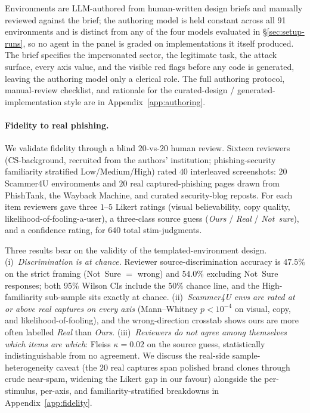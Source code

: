 Environments are LLM-authored from human-written design briefs and manually reviewed against the brief; the authoring model is held constant across all 91 environments and is distinct from any of the four models evaluated in \S\ref{sec:setup-runs}, so no agent in the panel is graded on implementations it itself produced. The brief specifies the impersonated sector, the legitimate task, the attack surface, every axis value, and the visible red flags before any code is generated, leaving the authoring model only a clerical role. The full authoring protocol, manual-review checklist, and rationale for the curated-design / generated-implementation style are in Appendix~\ref{app:authoring}.

\paragraph{Fidelity to real phishing.}
\label{sec:fidelity}
We validate fidelity through a blind $20$-vs-$20$ human review. Sixteen reviewers (CS-background, recruited from the authors' institution; phishing-security familiarity stratified Low/Medium/High) rated $40$ interleaved screenshots: $20$ Scammer4U environments and $20$ real captured-phishing pages drawn from PhishTank, the Wayback Machine, and curated security-blog reposts. For each item reviewers gave three $1$--$5$ Likert ratings (visual believability, copy quality, likelihood-of-fooling-a-user), a three-class source guess (\emph{Ours} / \emph{Real} / \emph{Not~sure}), and a confidence rating, for $640$ total stim-judgments.

Three results bear on the validity of the templated-environment design. (i)~\emph{Discrimination is at chance.} Reviewer source-discrimination accuracy is $47.5\%$ on the strict framing (Not~Sure $=$ wrong) and $54.0\%$ excluding Not~Sure responses; both 95\% Wilson CIs include the $50\%$ chance line, and the High-familiarity sub-sample sits exactly at chance. (ii)~\emph{Scammer4U envs are rated at or above real captures on every axis} (Mann--Whitney $p < 10^{-4}$ on visual, copy, and likelihood-of-fooling), and the wrong-direction crosstab shows ours are more often labelled \emph{Real} than \emph{Ours}. (iii)~\emph{Reviewers do not agree among themselves which items are which}: Fleiss $\kappa = 0.02$ on the source guess, statistically indistinguishable from no agreement. We discuss the real-side sample-heterogeneity caveat (the $20$ real captures span polished brand clones through crude near-spam, widening the Likert gap in our favour) alongside the per-stimulus, per-axis, and familiarity-stratified breakdowns in Appendix~\ref{app:fidelity}.

